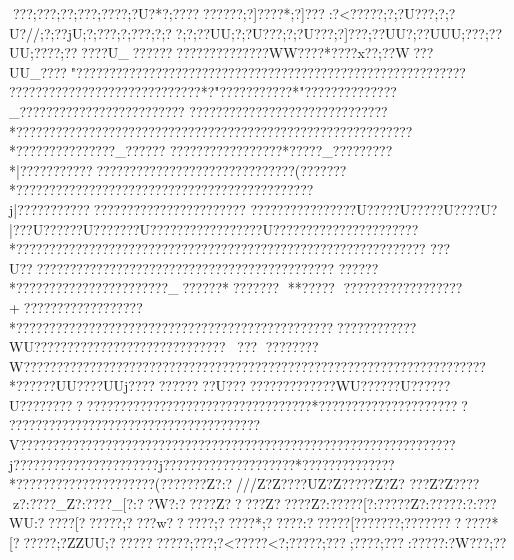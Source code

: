 {{{{{{{{{{{{{{{{{{{{{{{{{{{{{{{{{{{{{{{{{{{{{{{{{{{{{{{{{{{{{{{{{{{{{{{{{{{{{{{{{{{{{{{{{{{{{{{{{{{{{{{{{{{{{{{{{{{{{{{{{{{{{{{{{{{{{{{{{{{{{{{{{{{{{{{{{{{{{{{{{{{{{{{{{{{{{{{{{{{{{{{{{{{{{{{{{{{{{{{{{{{{{{{{{{{{{{{{{{{{{{{{{{{{{{{{{{{{{{{{{{{{{{{{{{{{{{{{{{{{{{{{{{{{{{{{{{{{{{{{{{{{{{{{{{{{{{{{{{{{{{{{{{{{{{{{{{{{{{{{{{{{{{{{{{{{{{{{{{{{{{{{{{{{{{{{{{{{{{{{{{{{{{{{{{{{{{{{{{{{{{{{{{{{{{{{{{{{{{{{{{{{{{{{{{{{{{{{{{{{{{{{{{{{{{{{{{{{{{{{{{{{{{{{{{{{{{{{{{{{{{{{{{{{{{{{{{{{{{{{{{{{{{{{{{{{{{{{{{{{{{{{{{{{{{{{{{{{{{{{{{{{{{{{{{{{{{{{{{{{{{{{{{{{{{{{{{{{{{{{{{{{{{{{{{{{{{{{{{{{{{{{{{{{{{{{{{{{{{{{{{{{{{{{{{{{{{{{{{{{{{{{{{{{{{{{{{{{{{{{{{{{{{{{{{{{{{{{{{{{{{{{{{{{{{{{{{{{{{{{{{{{{{{{{{{{{{{{{{{{{{{{{{{{{{{{{{{{{{{{{{{{{{{{{{{{{{{{{{{{{{{{{{{{{{{{{{{{{{{{{{{{{{{{{{{{{{{{{{{{{{{{{{{{{{{{{{{{{{{{{{{{{{{{{{{{{{{{{{{{{{{{{{{{{{{{{{{{{{{{{{{{{{{{{{{{{{{{{{{{{{{{{{{{{{{{{{{{{{{{{{{{{{{{{{{{{{{{{{{{{{{{{{{{{{{{{{{{{{{{{{{{{{{{{{{{{{{{{{{{{{{{{{{{{{{{{{{{{{{{{{{{{{{{{{{{{{{{{{{{{{{{{{{{{{{{{{{{{{{{{{{{{{{{{{{{{{{{{{{{{{{{{{{{{{{{{{{{{{{{{{{{{{{{{{{{{{{{{{{{{{{{{{{{{{{{{{{{{{{{{{{{{{{{{{{{{{{{{{{{{{{{{{{{{{{{{{{{{{{{{{{{{{{{{{{{{{{{{{{{{{{{{{{{{{{{{{{{{{{{{{{{{{{{{{{{{{{{{{{{{{{{{{{{{{{{{{{{{{{{{{{{{{{{{{{{{{{{{{{{{{{{{{{{{{{{{{{{{{{{{{{{{{{{{{{{{{{{{{{{{{{{{{{{{{{{{{{{{{{{{{{{{{{{{{{{{{{{{{{{{{{{{{{{{{{{{{{{{{{{{{{{{{{{{{{{{{{{{{{{{{{{{{{{{{{{{{{{{{{{{{{{{{{{{{{{{{{{{{{{{{{{{{{{{{{{{{{{{{{{{{{{{{{{{{{{{{{{{{{{{{{{{{{{{{{{{{{{{{{{{{{{{{{{{{{{{{{{{{{{{{{{{{???;?\?  ??;?\?   ?;?\??  ?;?}???;?\?U?*?;?}???  ??????;?]????*;?]??? :?<?????;?;?U???;?;?U?//;?;? ?jU;?;???  ;?;???  ;?;??  ;?;? ?UU;?;?U???;?;?U???;?]???  \?;? ?UU}?;??UUU;?\???  \?;? ?UU;?}??? ;?}????\?}?U_?}????? ??????????????WW}????*??}?\??x??;?}?W??\?}?UU_?}??? "?}???? ??????????????????????????????????????????????????????  ?????????????????????????????*?"????? ??????*"??????????????_?????????????????????????
??????????????????????????????*????????? ???????????????????????????????????????????????????*???????????????}_??????
?????????????????*?????_?????????*|??????????? ???????}???????????????????????(???????*?????????????????????????????????????????????j|??????????????????????????????????
??????? ??????? ??U{??? ??U{??? ??U{???  ?U{?|? ??U{??????U???????U????  ?????  ?????? ??U??????????????????????*??????????????????????????????????????????????????????????????
???U???????? ?????? ???????????????????? ?????????????
??????*???????????????????????_??????*???????
**?????
??????????????????+??????????????????*????????????????????????????????????????????   ???? ????  ????????WU????????????????????????????????
????????W??????????????????????????????????????????????????????????????????????
*??????UU????UUj????????????U??? ????? ????????WU??????U??????U????  ????? ?????????????? ????????????????????*?????????????????????? 
????????????   ??????????????????????????V??????????????????????????????????????????????????????????????????j??????????????????????j????????????????????* ??????????????*?????????????????????(???????Z?:?///Z?Z????UZ?Z?????Z?Z?
???Z?Z????z?:????_Z?:????_[?:??W?:?? ???Z?????Z?? ???Z?:?????[?:?????Z?:?????:?:???WU:?? ???[??????;????w??????;?????*;?????:??????[???????;????????????*[??????\?;?ZZUU;??????\??????;?\???  ;?<?????<?;?????;?\??? ;?}???  ;?}??  :?\?????:?\?W???;?}?}}}}}}}}}}}}}}}}}}}}}}}}}}}}}}}}}}}}}}}}}}}}}}}}}}}}}}}}}}}}}}}}}}}}}}}}}}}}}}}}}}}}}}}}}}}}}}}}}}}}}}}}}}}}}}}}}}}}}}}}}}}}}}}}}}}}}}}}}}}}}}}}}}}}}}}}}}}}}}}}}}}}}}}}}}}}}}}}}}}}}}}}}}}}}}}}}}}}}}}}}}}}}}}}}}}}}}}}}}}}}}}}}}}}}}}}}}}}}}}}}}}}}}}}}}}}}}}}}}}}}}}}}}}}}}}}}}}}}}}}}}}}}}}}}}}}}}}}}}}}}}}}}}}}}}}}}}}}}}}}}}}}}}}}}}}}}}}}}}}}}}}}}}}}}}}}}}}}}}}}}}}}}}}}}}}}}}}}}}}}}}}}}}}}}}}}}}}}}}}}}}}}}}}}}}}}}}}}}}}}}}}}}}}}}}}}}}}}}}}}}}}}}}}}}}}}}}}}}}}}}}}}}}}}}}}}}}}}}}}}}}}}}}}}}}}}}}}}}}}}}}}}}}}}}}}}}}}}}}}}}}}}}}}}}}}}}}}}}}}}}}}}}}}}}}}}}}}}}}}}}}}}}}}}}}}}}}}}}}}}}}}}}}}}}}}}}}}}}}}}}}}}}}}}}}}}}}}}}}}}}}}}}}}}}}}}}}}}}}}}}}}}}}}}}}}}}}}}}}}}}}}}}}}}}}}}}}}}}}}}}}}}}}}}}}}}}}}}}}}}}}}}}}}}}}}}}}}}}}}}}}}}}}}}}}}}}}}}}}}}}}}}}}}}}}}}}}}}}}}}}}}}}}}}}}}}}}}}}}}}}}}}}}}}}}}}}}}}}}}}}}}}}}}}}}}}}}}}}}}}}}}}}}}}}}}}}}}}}}}}}}}}}}}}}}}}}}}}}}}}}}}}}}}}}}}}}}}}}}}}}}}}}}}}}}}}}}}}}}}}}}}}}}}}}}}}}}}}}}}}}}}}}}}}}}}}}}}}}}}}}}}}}}}}}}}}}}}}}}}}}}}}}}}}}}}}}}}}}}}}}}}}}}}}}}}}}}}}}}}}}}}}}}}}}}}}}}}}}}}}}}}}}}}}}}}}}}}}}}}}}}}}}}}}}}}}}}}}}}}}}}}}}}}}}}}}}}}}}}}}}}}}}}}}}}}}}}}}}}}}}}}}}}}}}}}}}}}}}}}}}}}}}}}}}}}}}}}}}}}}}}}}}}}}}}}}}}}}}}}}}}}}}}}}}}}}}}}}}}}}}}}}}}}}}}}}}}}}}}}}}}}}}}}}}}}}}}}}}}}}}}}}}}}}}}}}}}}}}}}}}}}}}}}}}}}}}}}}}}}}}}}}}}}}}}}}}}}}}}}}}}}}}}}}}}}}}}}}}}}}}}}}}}}}}}}}}}}}}}}}}}}}}}}}}}}}}}}}}}}}}}}}}}}}}}}}}}}}}}}}}}}}}}}}}}}}}}}}}}}}}}}}}}}}}}}}}}}}}}}}}}}}}}}}}}}}}}}}}}}}}}}}}}}}}}}}}}}}}}}}}}}}}}}}}}}}}
